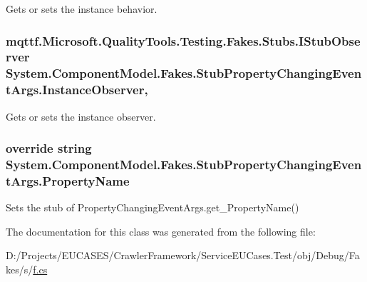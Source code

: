 Gets or sets the instance behavior.

\hypertarget{class_system_1_1_component_model_1_1_fakes_1_1_stub_property_changing_event_args_adfcee01eebd7c873faa132d81f482a80}{
\subsubsection[{Instance\-Observer}]{\setlength{\rightskip}{0pt plus 5cm}mqttf.\-Microsoft.\-Quality\-Tools.\-Testing.\-Fakes.\-Stubs.\-I\-Stub\-Observer System.\-Component\-Model.\-Fakes.\-Stub\-Property\-Changing\-Event\-Args.\-Instance\-Observer\hspace{0.3cm}{\ttfamily [get]}, {\ttfamily [set]}}}\label{class_system_1_1_component_model_1_1_fakes_1_1_stub_property_changing_event_args_adfcee01eebd7c873faa132d81f482a80}


Gets or sets the instance observer.

\hypertarget{class_system_1_1_component_model_1_1_fakes_1_1_stub_property_changing_event_args_a7b3e9151492b4d1046df8e6295a65d6d}{
\subsubsection[{Property\-Name}]{\setlength{\rightskip}{0pt plus 5cm}override string System.\-Component\-Model.\-Fakes.\-Stub\-Property\-Changing\-Event\-Args.\-Property\-Name\hspace{0.3cm}{\ttfamily [get]}}}\label{class_system_1_1_component_model_1_1_fakes_1_1_stub_property_changing_event_args_a7b3e9151492b4d1046df8e6295a65d6d}


Sets the stub of Property\-Changing\-Event\-Args.\-get\-\_\-\-Property\-Name()



The documentation for this class was generated from the following file\-:\begin{DoxyCompactItemize}
\item 
D\-:/\-Projects/\-E\-U\-C\-A\-S\-E\-S/\-Crawler\-Framework/\-Service\-E\-U\-Cases.\-Test/obj/\-Debug/\-Fakes/s/\hyperlink{s_2f_8cs}{f.\-cs}\end{DoxyCompactItemize}
